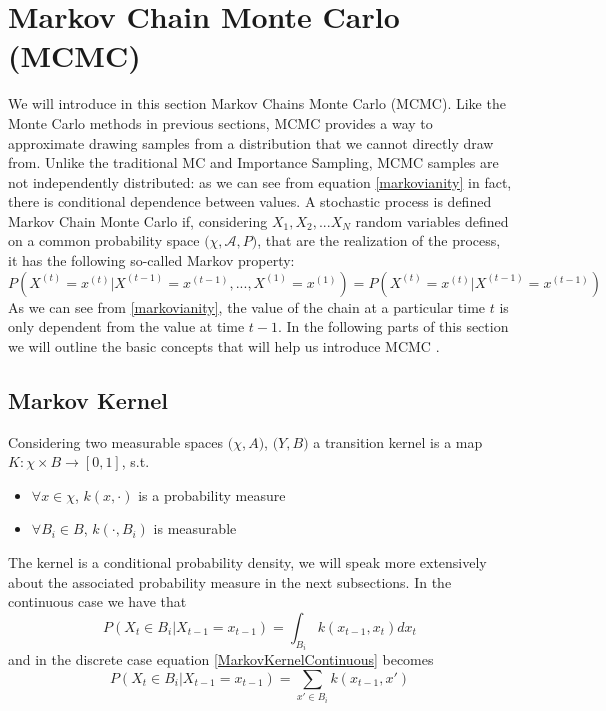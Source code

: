 \documentclass[12pt,mythesisstyle]{report}
\begin{document}
\section{Markov Chain Monte Carlo (MCMC)}\label{section: mcmc}
We will introduce in this section Markov Chains Monte Carlo (MCMC). Like the Monte Carlo methods in previous sections, MCMC provides a way to approximate drawing samples from a distribution that we cannot directly draw from. Unlike the traditional MC and Importance Sampling, MCMC samples are not independently distributed: as we can see from equation \eqref{markovianity} in fact, there is conditional dependence between values. A stochastic process is defined Markov Chain Monte Carlo if, considering $X_1, X_2, ...X_N$ random variables defined on a common probability space $\big(\chi, \mathcal{A}, P\big)$, that are the realization of the process, it has the following so-called Markov property:
\begin{equation}\label{markovianity}
P(X^{(t)}=x^{(t)}|X^{(t-1)}=x^{(t-1)},...,X^{(1)}=x^{(1)})=P(X^{(t)}=x^{(t)}|X^{(t-1)}=x^{(t-1)})
\end{equation}
As we can see from  \eqref{markovianity}, the value of the chain at a particular time $t$ is only dependent from the value at time $t-1$. In the following parts of this section we will outline the basic concepts that will help us introduce MCMC \cite{RobertCasella}.

\subsection{Markov Kernel}\label{section:Markovkernels}
Considering two measurable spaces $\big(\chi, A\big)$, $\big(Y, B\big)$ a transition kernel is a map \cite{RobertCasella}  $K:\chi \times B\rightarrow [0,1]$, s.t.

\begin{itemize}\label{MArkovKernel}
	\item $\forall x \in \chi$, $k(x,\cdot)$ is a probability measure
	\item $\forall B_i \in B$, $k(\cdot, B_i)$ is measurable
\end{itemize}
The kernel is a conditional probability density, we will speak more extensively about the associated probability measure in the next subsections. In the continuous case we have that
\begin{equation}\label{MarkovKernelContinuous}
P(X_t \in B_i|X_{t-1}=x_{t-1})=\int_{B_i}k(x_{t-1},x_t)dx_t
\end{equation}
and in the discrete case equation \eqref{MarkovKernelContinuous} becomes
\begin{equation}\label{MarkovKernelDiscrete}
P(X_t \in B_i|X_{t-1}=x_{t-1}) = \sum_{x'\in B_i} k(x_{t-1},x')
\end{equation}
\end{document}
